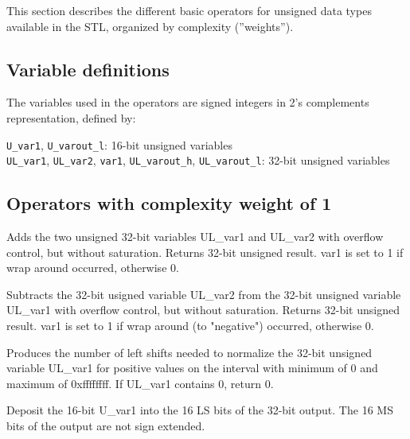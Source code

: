 This section describes the different basic operators for unsigned data types available in the STL, organized by complexity (”weights”).

\subsection{Variable definitions}

The variables used in the operators are signed integers in 2's complements representation, defined by:

{\tt U\_var1}, {\tt U\_varout\_l}: 16-bit unsigned variables\\
{\tt UL\_var1}, {\tt UL\_var2}, {\tt var1}, {\tt UL\_varout\_h}, {\tt UL\_varout\_l}: 32-bit unsigned variables


\subsection{Operators with complexity weight of 1}


Adds the two unsigned 32-bit variables UL\_var1 and UL\_var2 with overflow control, but without saturation.
Returns 32-bit unsigned result.
var1 is set to 1 if wrap around occurred, otherwise 0.


Subtracts the 32-bit usigned variable UL\_var2 from the 32-bit unsigned variable UL\_var1 with overflow control, but without saturation.
Returns 32-bit unsigned result.
var1 is set to 1 if wrap around (to "negative") occurred, otherwise 0.


Produces the number of left shifts needed to normalize the 32-bit unsigned variable UL\_var1 for positive values on the interval with minimum of 0 and maximum of 0xffffffff.
If UL\_var1 contains 0, return 0.


Deposit the 16-bit U\_var1 into the 16 LS bits of the 32-bit output. The 16 MS bits of the output are not sign extended.

